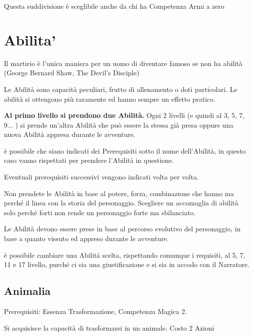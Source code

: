 \documentclass[a4paper,11pt,twoside,openany]{book}
\begin{document}
Questa suddivisione è sceglibile anche da chi ha Competenza Armi a zero

\pagebreak

\section{Abilita'}

\label{abilita}
\begin{tcolorbox}[enhanced,arc=5pt,boxrule=0.3pt]{Il martirio è l'unica maniera per un uomo di diventare famoso se non ha abilità (George Bernard Shaw, The Devil's Disciple)}\end{tcolorbox}\medskip

Le Abilità sono capacità peculiari, frutto di allenamento o doti particolari. Le abilità si ottengono più raramente ed hanno sempre un effetto pratico.

\textbf{Al primo livello si prendono due Abilità.} Ogni 2 livelli (e quindi al 3, 5, 7, 9... ) si prende un'altra Abilità che può essere la stessa già presa oppure una nuova Abilità appresa durante le avventure.

è possibile che siano indicati dei Prerequisiti sotto il nume dell'Abilità, in questo caso vanno rispettati per prendere l'Abilità in questione.

Eventuali prerequisiti successivi vengono indicati volta per volta.

Non prendete le Abilità in base al potere, forza, combinazione che hanno ma perché il linea con la storia del personaggio.
Scegliere un accozzaglia di abilità solo perché forti non rende un personaggio forte ma sbilanciato.

\medskip
Le Abilità devono essere prese in base al percorso evolutivo del personaggio, in base a quanto vissuto ed appreso durante le avventure.
\medskip

è possibile cambiare una Abilità scelta, rispettando comunque i requisiti, al 5, 7, 11 e 17 livello, purché ci sia una giustificazione e si sia in accodo con il Narratore.

\subsection{Animalia}

Prerequisiti: Essenza Trasformazione, Competenza Magica 2.

Si acquisisce la capacità di trasformarsi in un animale. Costo 2 Azioni
\end{document}
